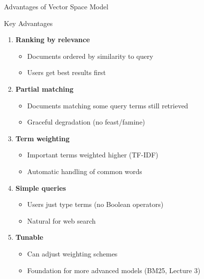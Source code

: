 \documentclass[aspectratio=169]{beamer}
\newif\ifanimated
\newcommand{\cpause}{\ifanimated\pause\fi}
\begin{document}
\begin{frame}[shrink=5]{Advantages of Vector Space Model}
\begin{block}{\checkmark Key Advantages}
\begin{enumerate}
    \item \textbf{Ranking by relevance}
    \begin{itemize}
        \item Documents ordered by similarity to query
        \item Users get best results first
    \end{itemize}
\cpause
    \item \textbf{Partial matching}
    \begin{itemize}
        \item Documents matching some query terms still retrieved
        \item Graceful degradation (no feast/famine)
    \end{itemize}
\cpause
    \item \textbf{Term weighting}
    \begin{itemize}
        \item Important terms weighted higher (TF-IDF)
        \item Automatic handling of common words
    \end{itemize}
\cpause
    \item \textbf{Simple queries}
    \begin{itemize}
        \item Users just type terms (no Boolean operators)
        \item Natural for web search
    \end{itemize}
\cpause
    \item \textbf{Tunable}
    \begin{itemize}
        \item Can adjust weighting schemes
        \item Foundation for more advanced models (BM25, Lecture 3)
    \end{itemize}
\cpause
\end{enumerate}
\end{block}
\end{frame}
\end{document}
